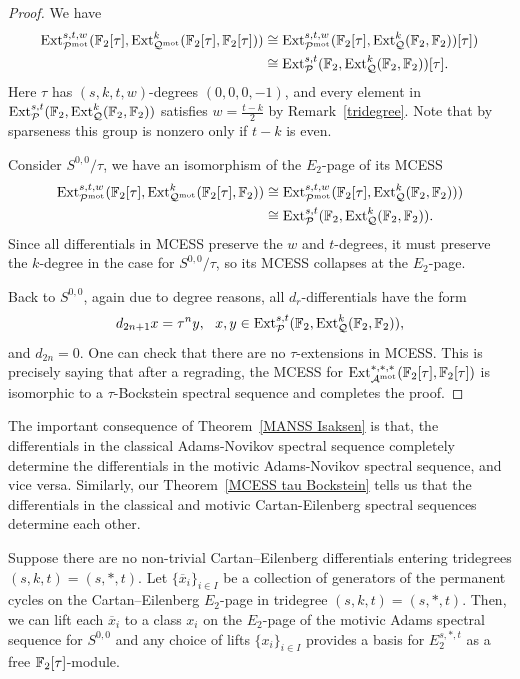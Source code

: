 \begin{proof}
We have 
\begin{align*}
\operatorname{\mathrm{Ext}}^{s,t,w}_{\mathcal{P}^{\textup{mot}}}(\operatorname{\mathbb{F}}_2[\tau], \operatorname{\mathrm{Ext}}^k_{\mathcal{Q}^\textup{mot}}(\operatorname{\mathbb{F}}_2[\tau], \operatorname{\mathbb{F}}_2[\tau])) & \cong \operatorname{\mathrm{Ext}}^{s,t,w}_{\mathcal{P}^\textup{mot}}(\operatorname{\mathbb{F}}_2[\tau], \operatorname{\mathrm{Ext}}^k_{\mathcal{Q}}(\operatorname{\mathbb{F}}_2, \operatorname{\mathbb{F}}_2))[\tau])  \\ 
& \cong \operatorname{\mathrm{Ext}}_{\mathcal{P}}^{s,t}(\operatorname{\mathbb{F}}_2, \operatorname{\mathrm{Ext}}^k_{\mathcal{Q}}(\operatorname{\mathbb{F}}_2, \operatorname{\mathbb{F}}_2))[\tau].
\end{align*}
Here $\tau$ has $(s,k,t,w)$-degrees $(0,0,0, -1)$, and every element in $\operatorname{\mathrm{Ext}}_{\mathcal{P}}^{s,t}(\operatorname{\mathbb{F}}_2, \operatorname{\mathrm{Ext}}^k_{\mathcal{Q}}(\operatorname{\mathbb{F}}_2, \operatorname{\mathbb{F}}_2))$ satisfies $w = \frac{t-k}{2}$ by Remark~\ref{tridegree}. Note that by sparseness this group is nonzero only if $t-k$ is even.

Consider $S^{0,0}/\tau$, we have an isomorphism of the $E_2$-page of its MCESS 
\begin{align*}
\operatorname{\mathrm{Ext}}^{s,t,w}_{\mathcal{P}^{\textup{mot}}}(\operatorname{\mathbb{F}}_2[\tau], \operatorname{\mathrm{Ext}}^k_{\mathcal{Q}^\textup{mot}}(\operatorname{\mathbb{F}}_2[\tau], \operatorname{\mathbb{F}}_2)) & \cong \operatorname{\mathrm{Ext}}^{s,t,w}_{\mathcal{P}^\textup{mot}}(\operatorname{\mathbb{F}}_2[\tau], \operatorname{\mathrm{Ext}}^k_{\mathcal{Q}}(\operatorname{\mathbb{F}}_2, \operatorname{\mathbb{F}}_2)))  \\ 
& \cong \operatorname{\mathrm{Ext}}_{\mathcal{P}}^{s,t}(\operatorname{\mathbb{F}}_2, \operatorname{\mathrm{Ext}}^k_{\mathcal{Q}}(\operatorname{\mathbb{F}}_2, \operatorname{\mathbb{F}}_2)).
\end{align*}
Since all differentials in MCESS preserve the $w$ and $t$-degrees, it must preserve the $k$-degree in the case for $S^{0,0}/\tau$, so its MCESS collapses at the $E_2$-page.

Back to $S^{0,0}$, again due to degree reasons, all $d_r$-differentials have the form
$$d_{2n+1} x = \tau^n y, \ \ x, y \in \operatorname{\mathrm{Ext}}_{\mathcal{P}}^{s,t}(\operatorname{\mathbb{F}}_2, \operatorname{\mathrm{Ext}}^k_{\mathcal{Q}}(\operatorname{\mathbb{F}}_2, \operatorname{\mathbb{F}}_2)),$$
and $d_{2n} = 0$. One can check that there are no $\tau$-extensions in MCESS. This is precisely saying that after a regrading, the MCESS for $\operatorname{\mathrm{Ext}}^{*, *, *}_{\operatorname{\mathcal{A}}^\textup{mot}}(\operatorname{\mathbb{F}}_2[\tau], \operatorname{\mathbb{F}}_2[\tau])$ is isomorphic to a $\tau$-Bockstein spectral sequence and completes the proof.
\end{proof}

\begin{rmk}
The important consequence of Theorem~\ref{MANSS Isaksen} is that, the differentials in the classical Adams-Novikov spectral sequence completely determine the differentials in the motivic Adams-Novikov spectral sequence, and vice versa. Similarly, our Theorem~\ref{MCESS tau Bockstein} tells us that the differentials in the classical and motivic Cartan-Eilenberg spectral sequences determine each other.
\end{rmk}

\begin{cor} \label{cor:no entering}
  Suppose there are no non-trivial Cartan--Eilenberg differentials entering tridegrees
  $(s,k,t) = (s,*,t)$.
  Let $\{\overline{x}_i\}_{i \in I}$ be a collection of generators of the permanent cycles on the Cartan--Eilenberg $E_2$-page in tridegree $(s,k,t) = (s,*,t)$.
  Then, we can lift each $\overline{x}_i$ to a class $x_i$ on the $E_2$-page of the motivic Adams spectral sequence for $S^{0,0}$ and any choice of lifts $\{x_i\}_{i \in I}$ provides a basis for $E_2^{s,*,t}$ as a free $\operatorname{\mathbb{F}}_2[\tau]$-module.
\end{cor}


